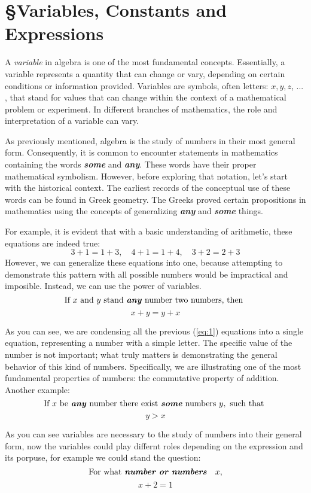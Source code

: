 \section{\S Variables, Constants and Expressions}
A \textit{variable} in algebra is one of the most fundamental concepts. Essentially, a variable represents a quantity that can change or vary, depending on certain conditions or information provided. Variables are symbols, often letters: $x, y, z$, ... , that stand for values that can change within the context of a mathematical problem or experiment. In different branches of mathematics, the role and interpretation of a variable can vary.

As previously mentioned, algebra is the study of numbers in their most general form. Consequently, it is common to encounter statements in mathematics containing the words \textbf{\textit{some}} and \textbf{\textit{any}}. These words have their proper mathematical symbolism. However, before exploring that notation, let's start with the historical context. The earliest records of the conceptual use of these words can be found in Greek geometry. The Greeks proved certain propositions in mathematics using the concepts of generalizing \textbf{\textit{any}} and \textbf{\textit{some}} things.

For example, it is evident that with a basic understanding of arithmetic, these equations are indeed true:
\begin{equation} \label{eq:1}
  3 + 1 = 1 + 3,\quad 4 + 1 = 1 + 4,\quad 3 + 2 = 2 + 3
\end{equation}
However, we can generalize these equations into one, because attempting to demonstrate this pattern with all possible numbers would be impractical and imposible. Instead, we can use the power of variables.
\[
  \text{If } x \text{ and } y \text{ stand \textbf{\textit{any}} number two numbers, then }
\]
\[
  x + y = y + x
\]

As you can see, we are condensing all the previous (\ref{eq:1}) equations into a single equation, representing a number with a simple letter. The specific value of the number is not important; what truly matters is demonstrating the general behavior of this kind of numbers. Specifically, we are illustrating one of the most fundamental properties of numbers: the commutative property of addition. Another example:
\[
  \text{If } x \text{ be \textbf{\textit{any}} number there exist \textbf{\textit{some}} numbers } y, \text{ such that }
\]
\[
  y > x
\]

As you can see variables are necessary to the study of numbers into their general form, now the variables
could play differnt roles depending on the expression and its porpuse, for example we could stand the question:
\begin{equation} \label{eq:2}
    \text{For what \textbf{\textit{number or numbers}}}\quad x,
\end{equation}
\[
  x + 2 = 1
\]
  
